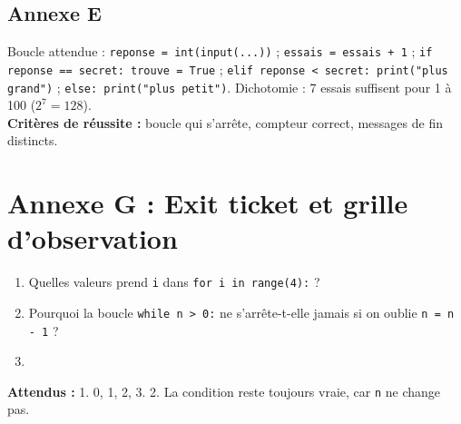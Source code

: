 \documentclass[11pt,a4paper]{article}
\begin{document}
\subsection*{Annexe E}
Boucle attendue : \texttt{reponse = int(input(...))} ; \texttt{essais = essais + 1} ; \texttt{if reponse == secret: trouve = True} ; \texttt{elif reponse < secret: print("plus grand")} ; \texttt{else: print("plus petit")}. Dichotomie : 7 essais suffisent pour 1 à 100 ($2^7 = 128$).\\
\textbf{Critères de réussite :} boucle qui s'arrête, compteur correct, messages de fin distincts.

\newpage
\section*{Annexe G : Exit ticket et grille d'observation}

\begin{enumerate}
 \item Quelles valeurs prend \texttt{i} dans \texttt{for i in range(4):} ?\\ \lig
 \item Pourquoi la boucle \texttt{while n > 0:} ne s'arrête-t-elle jamais si on oublie \texttt{n = n - 1} ?\\ \lig
 \item \autoeval
\end{enumerate}
\textbf{Attendus :} 1. 0, 1, 2, 3. 2. La condition reste toujours vraie, car \texttt{n} ne change pas.

\bigskip
{}
\end{document}

